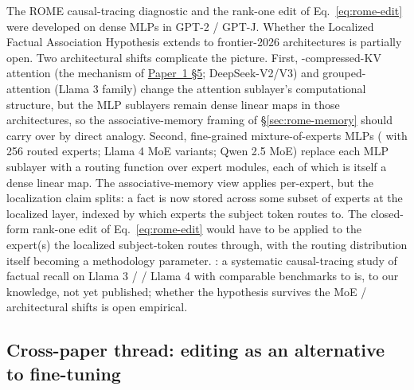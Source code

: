 The ROME causal-tracing diagnostic and the rank-one edit of
Eq.~\eqref{eq:rome-edit} were developed on dense  MLPs in
GPT-2 / GPT-J. Whether the Localized Factual Association Hypothesis
extends to frontier-2026 architectures is partially open. Two
architectural shifts complicate the picture. First, -compressed-KV
attention (the  mechanism of \hyperref[P1-sec:attention-kv-sharing]{Paper~1 §5}; DeepSeek-V2/V3) and grouped- attention (Llama 3 family)
change the attention sublayer's computational structure, but the MLP
sublayers remain dense linear maps in those architectures, so the
associative-memory framing of \S\ref{sec:rome-memory} should carry
over by direct analogy. Second, fine-grained mixture-of-experts MLPs
( with 256 routed experts; Llama 4 MoE variants; Qwen 2.5
MoE) replace each MLP sublayer with a routing function over expert
modules, each of which is itself a dense linear map. The
associative-memory view applies per-expert, but the localization claim
splits: a fact is now stored across some subset of experts at the
localized layer, indexed by which experts the subject token routes to.
The closed-form rank-one edit of Eq.~\eqref{eq:rome-edit} would have
to be applied to the expert(s) the localized subject-token routes
through, with the routing distribution itself becoming a methodology
parameter. : a systematic causal-tracing study of factual recall
on Llama 3 /  / Llama 4 with comparable benchmarks to
\citet{meng2022-rome} is, to our knowledge, not yet published; whether
the hypothesis survives the MoE /  architectural shifts is open
empirical.

\subsection{Cross-paper thread: editing as an alternative to fine-tuning}
\label{sec:rome-vs-finetune}

